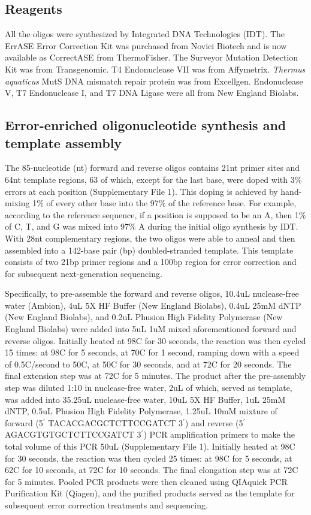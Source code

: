 \documentclass[twocolumn]{article}
\begin{document}
\subsection*{Reagents}
All the oligos were synthesized by Integrated DNA Technologies (IDT). The ErrASE Error Correction Kit was purchased from Novici Biotech and is now available as CorrectASE from ThermoFisher. The Surveyor Mutation Detection Kit was from Transgenomic. T4 Endonuclease VII was from Affymetrix. \textit{Thermus aquaticus} MutS DNA mismatch repair protein was from Excellgen. Endonuclease V, T7 Endonuclease I, and T7 DNA Ligase were all from New England Biolabs.

\subsection*{Error-enriched oligonucleotide synthesis and template assembly}
The 85-nucleotide (nt) forward and reverse oligos contains 21nt primer sites and 64nt template regions, 63 of which, except for the last base, were doped with 3\% errors at each position (Supplementary File 1). This doping is achieved by hand-mixing 1\% of every other base into the 97\% of the reference base. For example, according to the reference sequence, if a position is supposed to be an A, then 1\% of C, T, and G was mixed into 97\% A during the initial oligo synthesis by IDT. With 28nt complementary regions, the two oligos were able to anneal and then assembled into a 142-base pair (bp) doubled-stranded template. This template consists of two 21bp primer regions and a 100bp region for error correction and for subsequent next-generation sequencing.

Specifically, to pre-assemble the forward and reverse oligos, 10.4uL nuclease-free water (Ambion), 4uL 5X HF Buffer (New England Biolabs), 0.4uL 25mM dNTP (New England Biolabs), and 0.2uL Phusion High Fidelity Polymerase (New England Biolabs) were added into 5uL 1uM mixed aforementioned forward and reverse oligos. Initially heated at 98C for 30 seconds, the reaction was then cycled 15 times: at 98C for 5 seconds, at 70C for 1 second, ramping down with a speed of 0.5C/second to 50C, at 50C for 30 seconds, and at 72C for 20 seconds. The final extension step was at 72C for 5 minutes.
%
The product after the pre-assembly step was diluted 1:10 in nuclease-free water, 2uL of which, served as template, was added into 35.25uL nuclease-free water, 10uL 5X HF Buffer, 1uL 25mM dNTP, 0.5uL Phusion High Fidelity Polymerase, 1.25uL 10mM mixture of forward (5$^\prime$ TACACGACGCTCTTCCGATCT 3$^\prime$) and reverse (5$^\prime$ AGACGTGTGCTCTTCCGATCT 3$^\prime$) PCR amplification primers to make the total volume of this PCR 50uL (Supplementary File 1). Initially heated at 98C for 30 seconds, the reaction was then cycled 25 times: at 98C for 5 seconds, at 62C for 10 seconds, at 72C for 10 seconds. The final elongation step was at 72C for 5 minutes. Pooled PCR products were then cleaned using QIAquick PCR Purification Kit (Qiagen), and the purified products served as the template for subsequent error correction treatments and sequencing.
\end{document}
